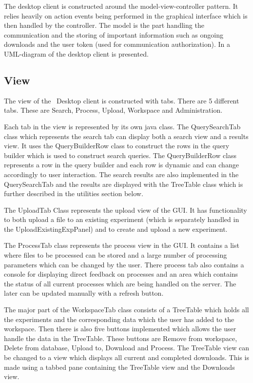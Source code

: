 The desktop client is constructed around the model-view-controller pattern. It
relies heavily on action events being performed in the graphical interface which
is then handled by the controller. The model is the part handling the
communication and the storing of important information such as ongoing downloads
and the user token (used for communication authorization). In
 a UML-diagram of the desktop client is presented. 

\subsection{View}
The view of the \appName\ Desktop client is constructed with tabs. There are 5 different tabs. These are Search, Process, Upload, Workspace and Administration.

Each tab in the view is represented by its own java class. The QuerySearchTab class which represents the search tab can display both a search view and a results view. It uses the QueryBuilderRow class to construct the rows in the query builder which is used to construct search queries. The QueryBuilderRow class represents a row in the query builder and each row is dynamic and can change accordingly to user interaction. The search results are also implemented in the QuerySearchTab and the results are displayed with the TreeTable class which is further described in the utilities section below.

The UploadTab Class represents the upload view of the GUI. It has functionality to both upload a file to an existing experiment (which is separately handled in the UploadExistingExpPanel) and to create and upload a new experiment.

The ProcessTab class represents the process view in the GUI. It contains a list where files to be processed can be stored and a large number of processing parameters which can be changed by the user. There process tab also contains a console for displaying direct feedback on processes and an area which contains the status of all current processes which are being handled on the server. The later can be updated manually with a refresh button.

The major part of the WorkspaceTab class consists of a TreeTable which holds all the experiments and the corresponding data which the user has added to the workspace. Then there is also five buttons implemented which allows the user handle the data in the TreeTable. These buttons are Remove from workspace, Delete from database, Upload to, Download and Process. The TreeTable view can be changed to a view which displays all current and completed downloads. This is made using a tabbed pane containing the TreeTable view and the Downloads view.

